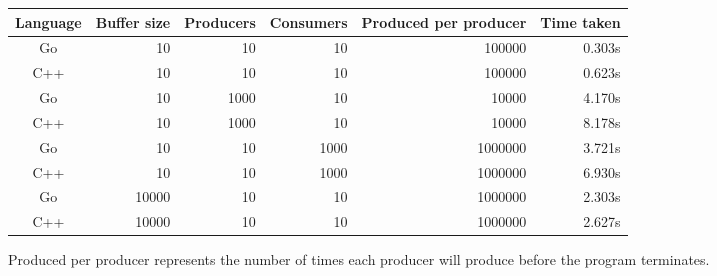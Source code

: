 \documentclass[11pt]{article}
\begin{document}
\begin{tabular}{c r r r r r}
Language    & Buffer size & Producers & Consumers & Produced per producer & Time taken \\
\toprule
Go 			& 10 & 10 & 10 & 100000 & 0.303s \\
C++         & 10 & 10 & 10 & 100000 & 0.623s \\
\cmidrule{1-6}
Go 			& 10 & 1000 & 10 & 10000 & 4.170s \\
C++         & 10 & 1000 & 10 & 10000 & 8.178s \\
\cmidrule{1-6}
Go 			& 10 & 10 & 1000 & 1000000 & 3.721s \\
C++         & 10 & 10 & 1000 & 1000000 & 6.930s \\
\cmidrule{1-6}
Go 			& 10000 & 10 & 10 & 1000000 & 2.303s \\
C++         & 10000 & 10 & 10 & 1000000 & 2.627s \\
\end{tabular}
\newline
Produced per producer represents the number of times each producer will produce before the program terminates.
\pagebreak
\end{document}
